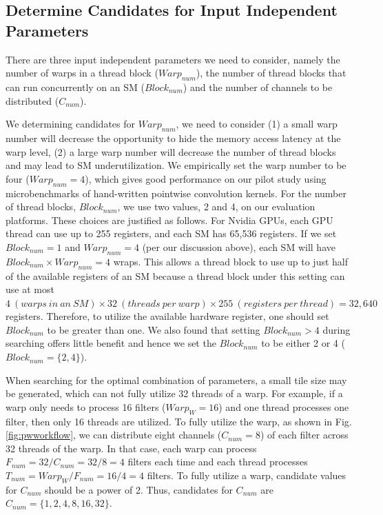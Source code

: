 \subsection{Determine Candidates for Input Independent Parameters}
There are three input independent parameters we need to consider, namely the number of warps in a thread block ($Warp_{num}$), the number of thread blocks that can run concurrently on an SM ($Block_{num}$) and the number of channels to be distributed ($C_{num}$).

We determining candidates for $Warp_{num}$, we need to consider (1) a small warp number will decrease the opportunity to hide the memory access latency at the warp level, (2) a large warp number will decrease the number of thread blocks and may lead to SM underutilization. 
We empirically set the warp number to be four ($Warp_{num}=4$), which gives good performance on our pilot study using microbenchmarks of hand-written pointwise convolution kernels. 
For the number of thread blocks, $Block_{num}$, we use two values, 2 and 4, on our evaluation platforms. 
These choices are justified as follows. For Nvidia GPUs, each GPU thread can use up to 255 registers, and each SM has 65,536 registers. 
If we set $Block_{num}=1$ and $Warp_{num}=4$ (per our discussion above), each SM will have $Block_{num} \times Warp_{num}=4$ wraps. 
This allows a thread block to use up to just half of the available registers of an SM because a thread block under this setting can use at most $4\ (warps\ in\ an\ SM) \times 32\ (threads\ per\ warp) \times 255\ (registers\ per\ thread)=32,640$ registers. 
Therefore, to utilize the available hardware register, one should set $Block_{num}$ to be greater than one. 
We also found that setting $Block_{num}>4$ during searching offers little benefit and hence we set the $Block_{num}$ to be either 2 or 4 ($Block_{num}=\{2,4\}$).


When searching for the optimal combination of parameters, a small tile size may be generated, which can not fully utilize 32 threads of a warp.
 For example, if a warp only needs to process 16 filters ($Warp_W=16$) and one thread processes one filter, then only 16 threads are utilized. 
 To fully utilize the warp, as shown in Fig. \ref{fig:pwworkflow}, we can distribute eight channels ($C_{num}=8$) of each filter across 32 threads of the warp. 
 In that case, each warp can process $F_{num}=32/C_{num}=32/8=4$ filters each time and each thread processes $T_{num}=Warp_W/F_{num}=16/4=4$ filters.
To fully utilize a warp, candidate values for $C_{num}$ should be a power of 2.
Thus, candidates for $C_{num}$ are $C_{num}=\{1,2,4,8,16,32\}$.


